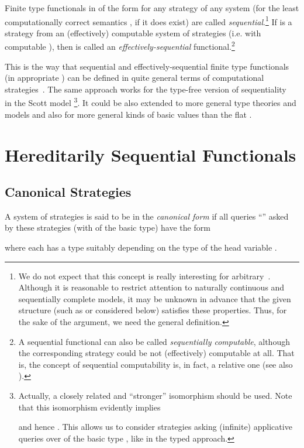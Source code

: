 \documentclass[fleqn]{LMCS}
\theoremstyle{plain}\newtheorem{satz}[thm]{Satz}
\theoremstyle{plain}\newtheorem{hyp}[thm]{Hypothesis}
\theoremstyle{plain}\newtheorem{hyps}[thm]{Hypotheses}
\theoremstyle{definition}\newtheorem{note}[thm]{Note}
\newcommand{\?}{\mbox{?}}
\begin{document}
\begin{defi}\label{def:seq-func}Finite type functionals in  of the form  
for any strategy  of any system 
(for the least computationally correct semantics , 
if it does exist)
are called 
\emph{sequential}.\footnote{We do not expect that this concept is really interesting 
for arbitrary~. 
Although it is reasonable to restrict attention to naturally continuous and 
sequentially complete models, it may be unknown in advance that the given structure 
(such as  or  considered below) satisfies these properties. 
Thus, for the sake of the argument, we need the general definition. 
}
If  is a strategy from an (effectively) computable system 
of strategies  (i.e. with computable 
), 
then  is called
an \emph{effectively-sequential} functional.\footnote{A sequential functional can also be called 
\emph{sequentially computable}, although the corresponding strategy could 
be not (effectively) computable at all. 
That is, the concept of sequential computability is, in fact, a relative one 
(see also \cite{MTrakhte76TCS,Saz76d}).
}
\end{defi}

\noindent
This is the way that sequential and effectively-sequential finite type functionals 
(in appropriate ) can be defined in quite general terms of 
computational strategies~\cite{Saz76AL}. The same approach works for the 
type-free version of sequentiality~\cite{Saz76SMZH} in the Scott model 
\footnote{\label{foot:Dinfty}
Actually, a closely related and ``stronger'' isomorphism 
 should be used. 
Note that this isomorphism evidently implies 

and hence 
.
This allows us to consider strategies asking (infinite) 
applicative queries over  
of the basic type , like in the typed approach. 
}. 
It could be also extended to more 
general type theories and models and also for more general kinds 
of basic values than the flat . 





\section{Hereditarily Sequential Functionals}
\label{sec-seq-func}


\subsection{Canonical Strategies}
\label{sec:canonical}

\begin{defi}\label{def:canonical}
A system of strategies is said to be in the \emph{canonical form} if
all queries ``'' asked by these strategies 
 (with  of the basic type) have the form 

\noindent
where each  
has a type suitably depending on the type of the head variable .
\end{defi}
\end{document}
